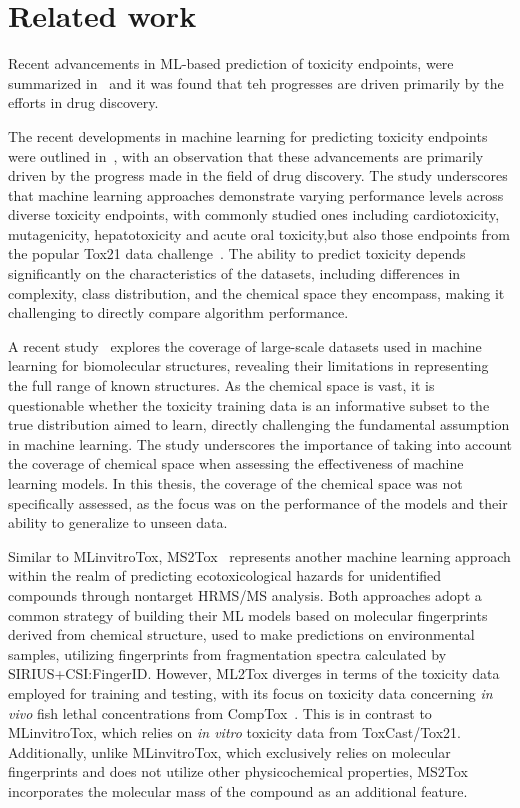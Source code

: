 \chapter{Related work}\label{chap:related_work}

Recent advancements in ML-based prediction of toxicity endpoints, were summarized in~\cite{cavasotto2022} and it was found that teh progresses are driven primarily by the efforts in drug discovery. 

The recent developments in machine learning for predicting toxicity endpoints were outlined in~\cite{cavasotto2022}, with an observation that these advancements are primarily driven by the progress made in the field of drug discovery. The study underscores that machine learning approaches demonstrate varying performance levels across diverse toxicity endpoints, with commonly studied ones including cardiotoxicity, mutagenicity, hepatotoxicity and acute oral toxicity,but also those endpoints from the popular Tox21 data challenge~\cite{richard2021}. The ability to predict toxicity depends significantly on the characteristics of the datasets, including differences in complexity, class distribution, and the chemical space they encompass, making it challenging to directly compare algorithm performance.

A recent study~\cite{kretschmer2023} explores the coverage of large-scale datasets used in machine learning for biomolecular structures, revealing their limitations in representing the full range of known structures. As the chemical space is vast, it is questionable whether the toxicity training data is an informative subset to the true distribution aimed to learn, directly challenging the fundamental assumption in machine learning. The study underscores the importance of taking into account the coverage of chemical space when assessing the effectiveness of machine learning models. In this thesis, the coverage of the chemical space was not specifically assessed, as the focus was on the performance of the models and their ability to generalize to unseen data.

Similar to MLinvitroTox, MS2Tox~\cite{peets2022} represents another machine learning approach within the realm of predicting ecotoxicological hazards for unidentified compounds through nontarget HRMS/MS analysis. Both approaches adopt a common strategy of building their ML models based on molecular fingerprints derived from chemical structure, used to make predictions on environmental samples, utilizing fingerprints from fragmentation spectra calculated by SIRIUS+CSI:FingerID. However, ML2Tox diverges in terms of the toxicity data employed for training and testing, with its focus on toxicity data concerning \emph{in vivo} fish lethal concentrations from CompTox~\cite{williams2017}. This is in contrast to MLinvitroTox, which relies on \emph{in vitro} toxicity data from ToxCast/Tox21. Additionally, unlike MLinvitroTox, which exclusively relies on molecular fingerprints and does not utilize other physicochemical properties, MS2Tox incorporates the molecular mass of the compound as an additional feature.


